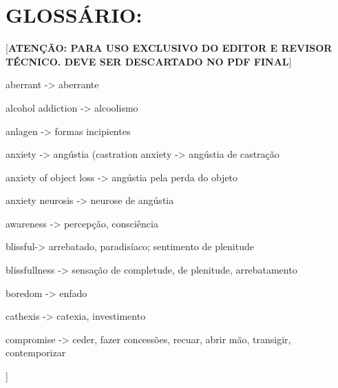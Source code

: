 
\cleardoublepage

\pagestyle{empty}

\section*{GLOSSÁRIO:}  

[\textbf{ATENÇÃO: PARA USO EXCLUSIVO DO EDITOR E REVISOR TÉCNICO. DEVE SER DESCARTADO NO PDF FINAL}]

\bigskip

\noindent aberrant -> aberrante

\smallskip

\noindent alcohol addiction -> alcoolismo

\smallskip

\noindent anlagen -> formas incipientes

\smallskip

\noindent anxiety -> angústia (castration anxiety -> angústia de castração

\smallskip

\noindent anxiety of object loss -> angústia pela perda do objeto

\smallskip

\noindent anxiety neurosis -> neurose de angústia

\smallskip

\noindent awareness -> percepção, consciência

\smallskip

\noindent blissful-> arrebatado,  paradisíaco; sentimento de plenitude

\smallskip

\noindent blissfullness -> sensação de completude, de plenitude, arrebatamento

\smallskip

\noindent boredom -> enfado

\smallskip

\noindent cathexis -> catexia, investimento

\smallskip

\noindent compromise -> ceder, fazer concessões, recuar, abrir mão,
transigir, contemporizar

\smallskip

\noindent [``\textit{compromise
formation'}''-> (termo em
alemão: \textit{Kompromißbildung}) = solução intermediária,
meio-\ \ \ \ \ \ termo; \ \ acordo de conciliação [``Há,
no termo, algo da ordem de um
`conformar-se', de um
\ \ \ \ \ \ recuar para uma situação possível.'' (Luiz
Hanns)]]

